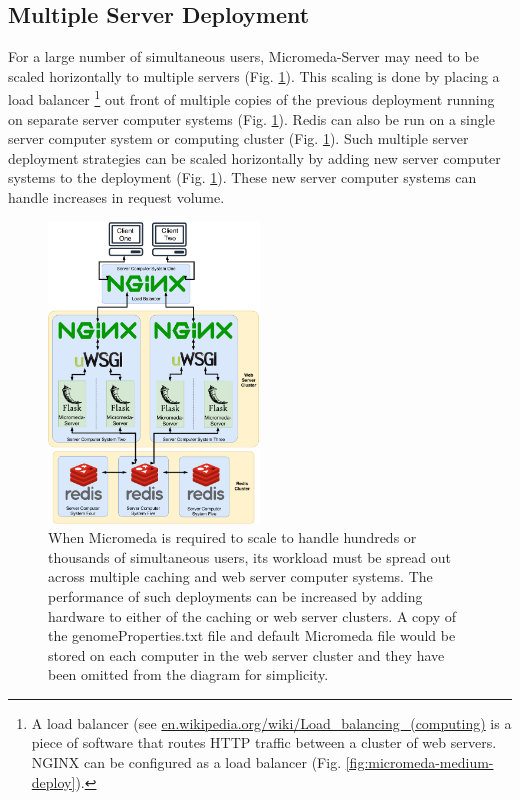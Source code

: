 \subsection{Multiple Server Deployment} \label{multi-server-micromeda-deployment}

For a large number of simultaneous users, Micromeda-Server may need to be scaled horizontally to multiple servers (Fig. \ref{fig:micromeda-large-deploy}). This scaling is done by placing a load balancer \footnote{A load balancer (see \href{en.wikipedia.org/wiki/Load\_balancing\_(computing)}{en.wikipedia.org/wiki/Load\_balancing\_(computing)} is a piece of software that routes HTTP traffic between a cluster of web servers. NGINX \cite{reese2008nginx} can be configured as a load balancer (Fig. \ref{fig:micromeda-medium-deploy}).} out front of multiple copies of the previous deployment running on separate server computer systems (Fig. \ref{fig:micromeda-large-deploy}). Redis can also be run on a single server computer system or computing cluster (Fig. \ref{fig:micromeda-large-deploy}). Such multiple server deployment strategies can be scaled horizontally by adding new server computer systems to the deployment (Fig. \ref{fig:micromeda-large-deploy}). These new server computer systems can handle increases in request volume.

\begin{figure}[!ht]
  \centering
	\includegraphics[width=0.50\textwidth]{media/micromeda-heavy-deployment.pdf}
	 \caption{When Micromeda is required to scale to handle hundreds or thousands of simultaneous users, its workload must be spread out across multiple caching and web server computer systems. The performance of such deployments can be increased by adding hardware to either of the caching or web server clusters. A copy of the genomeProperties.txt file and default Micromeda file would be stored on each computer in the web server cluster and they have been omitted from the diagram for simplicity.}
	 \label{fig:micromeda-large-deploy}
\end{figure}

